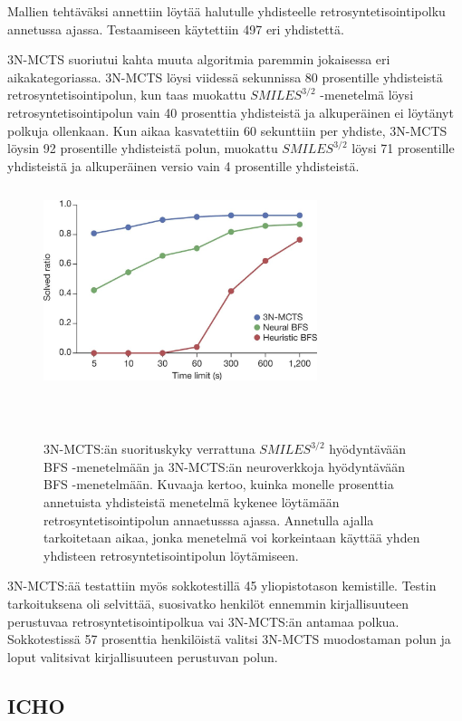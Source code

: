\documentclass[finnish,twoside,censored,tkt,sw-line]{HYthesisML}
\begin{document}
Mallien tehtäväksi annettiin löytää halutulle yhdisteelle retrosyntetisointipolku annetussa ajassa.
Testaamiseen käytettiin 497 eri yhdistettä.

3N-MCTS suoriutui kahta muuta algoritmia paremmin jokaisessa eri aikakategoriassa.
3N-MCTS löysi viidessä sekunnissa 80 prosentille yhdisteistä retrosyntetisointipolun, kun taas muokattu \(SMILES^{3/2}\) -menetelmä löysi retrosyntetisointipolun vain 40 prosenttia yhdisteistä ja alkuperäinen ei löytänyt polkuja ollenkaan.
Kun aikaa kasvatettiin 60 sekunttiin per yhdiste, 3N-MCTS löysin 92 prosentille yhdisteistä polun, muokattu \(SMILES^{3/2}\) löysi 71 prosentille yhdisteistä ja alkuperäinen versio vain 4 prosentille yhdisteistä.

\begin{figure}[ht]
    \centering
    \includegraphics[width=8cm, height=6cm]{3N-MCTS-performance-fig.jpg}
    \caption{
        3N-MCTS:än suorituskyky verrattuna \(SMILES^{3/2}\) hyödyntävään BFS -menetelmään ja 3N-MCTS:än neuroverkkoja hyödyntävään BFS -menetelmään.
        Kuvaaja kertoo, kuinka monelle prosenttia annetuista yhdisteistä menetelmä kykenee löytämään retrosyntetisointipolun annaetusssa ajassa.
        Annetulla ajalla tarkoitetaan aikaa, jonka menetelmä voi korkeintaan käyttää yhden yhdisteen retrosyntetisointipolun löytämiseen.
    }
    {~\cite{SeglerMarwinHS2018Pcsw}}
\end{figure}

3N-MCTS:ää testattiin myös sokkotestillä 45 yliopistotason kemistille.
Testin tarkoituksena oli selvittää, suosivatko henkilöt ennemmin kirjallisuuteen perustuvaa retrosyntetisointipolkua vai 3N-MCTS:än antamaa polkua.
Sokkotestissä 57 prosenttia henkilöistä valitsi 3N-MCTS muodostaman polun ja loput valitsivat kirjallisuuteen perustuvan polun.

\subsection{ICHO}
\end{document}
